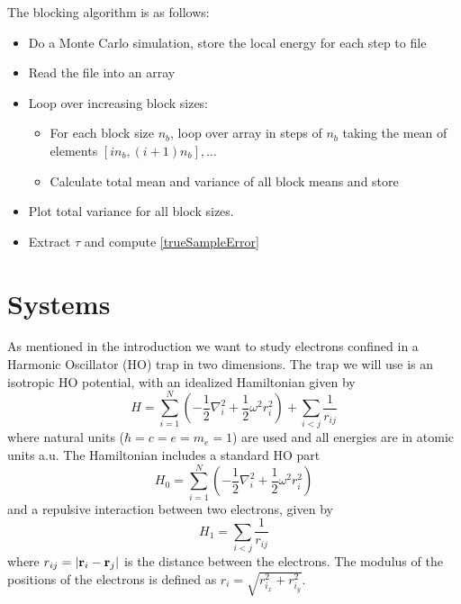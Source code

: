 \documentclass[english, a4paper]{article}
\begin{document}
\noindent The blocking algorithm is as follows:
\begin{itemize}
 \item Do a Monte Carlo simulation, store the local energy for each step to file
 \item Read the file into an array
 \item Loop over increasing block sizes:
 \begin{itemize}
     \item For each block size $n_b$, loop over array in steps of $n_b$ taking the mean of elements
           $[in_b, (i+1)n_b] , \dots $
     \item Calculate total mean and variance of all block means and store
 \end{itemize}
 \item Plot total variance for all block sizes. 
 \item Extract $\tau$ and compute \eqref{trueSampleError}
\end{itemize}

\section{Systems}
As mentioned in the introduction we want to study electrons confined in a Harmonic Oscillator (HO) 
trap in two dimensions. The trap we will use 
is an isotropic HO potential, with an idealized Hamiltonian given by
\begin{equation}
 H = \sum_{i=1}^N\left(-\frac{1}{2} \nabla_i^2 + \frac{1}{2} \omega^2 r_i^2 \right) + \sum_{i<j} \frac{1}{r_{ij}}
 \label{fullHamiltonian}
\end{equation}
where natural units ($\hbar = c = e = m_e = 1$) are used and all energies are in atomic units a.u. 
The Hamiltonian includes a standard HO part
\begin{equation}
 H_0 = \sum_{i=1}^N \left( -\frac{1}{2}\nabla_i^2 + \frac{1}{2}\omega^2 r_i^2 \right)
 \label{HOHamiltonian}
\end{equation}
and a repulsive interaction between two electrons, given by
\begin{equation}
 H_1 = \sum_{i < j} \frac{1}{r_{ij}}
 \label{repulsiveHamiltonian}
\end{equation}
where $r_{ij} = |{\bf r}_i - {\bf r}_j|$ is the distance between the electrons. 
The modulus of the positions of the electrons is defined as $r_i = \sqrt{r_{i_x}^2 + r_{i_y}^2}$.
\end{document}
